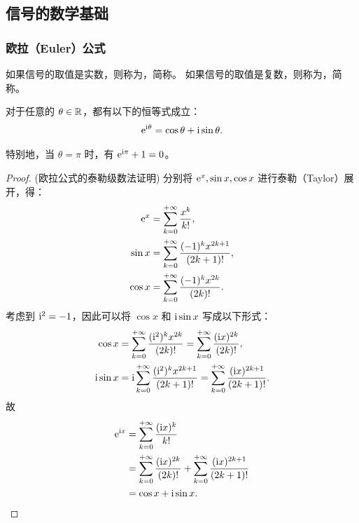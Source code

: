 \subsection{信号的数学基础}

\subsubsection{欧拉（Euler）公式}

\begin{definition}[实值信号与复值信号]
    如果信号的取值是实数，则称为，简称。
    如果信号的取值是复数，则称为，简称。
\end{definition}

\begin{theorem}[欧拉公式]
    对于任意的 $\theta \in \mathbb{R}$，都有以下的恒等式成立：
    \begin{align*}
        \mathrm{e}^{\mathrm{i} \theta} = \cos \theta + \mathrm{i} \sin\theta.
    \end{align*}

    特别地，当 $\theta = \pi$ 时，有 $\mathrm{e}^{\mathrm{i}\pi} + 1 = 0$。
\end{theorem}

\begin{proof}
    (欧拉公式的泰勒级数法证明) 分别将 $\mathrm{e}^x, \sin x, \cos x$ 进行泰勒（Taylor）展开，得：
    \begin{align*}
        \mathrm{e}^x &= \sum_{k = 0}^{+\infty}\frac{x^k}{k!}, \\
        \sin x   &= \sum_{k = 0}^{+\infty}\frac{(-1)^kx^{2k + 1}}{(2k + 1)!}, \\
        \cos x   &= \sum_{k = 0}^{+\infty}\frac{(-1)^kx^{2k}}{(2k)!}.
    \end{align*}
    考虑到 $\mathrm{i}^2 = -1$，因此可以将 $\cos x$ 和 $\mathrm{i}\sin x$ 写成以下形式：
    \begin{align*}
        \cos x &= \sum_{k = 0}^{+\infty}\frac{(\mathrm{i}^2)^kx^{2k}}{(2k)!}
                = \sum_{k = 0}^{+\infty}\frac{(\mathrm{i} x)^{2k}}{(2k)!}, \\
        \mathrm{i}\sin x &= \mathrm{i}\sum_{k = 0}^{+\infty}\frac{(\mathrm{i}^2)^kx^{2k + 1}}{(2k + 1)!}
                = \sum_{k = 0}^{+\infty}\frac{(\mathrm{i} x)^{2k + 1}}{(2k + 1)!}.
    \end{align*}
    故
    \begin{align*}
        \mathrm{e}^{\mathrm{i} x} & = \sum_{k = 0}^{+\infty}\frac{(\mathrm{i} x)^k}{k!} \\
        & = \sum_{k = 0}^{+\infty}\frac{(\mathrm{i} x)^{2k}}{(2k)!} + 
            \sum_{k = 0}^{+\infty}\frac{(\mathrm{i} x)^{2k + 1}}{(2k + 1)!} \\
        & = \cos x + \mathrm{i} \sin x.
    \end{align*}
\end{proof}

